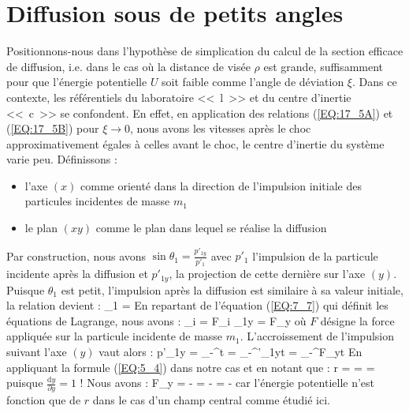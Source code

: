 \section{Diffusion sous de petits angles}

Positionnons-nous dans l'hypoth\`ese de simplication du calcul de la section efficace de diffusion, i.e. dans le cas o\`u la distance de vis\'ee $\rho$ est grande, suffisamment pour que l'\'energie potentielle $U$ soit faible comme l'angle de d\'eviation $\xi$. Dans ce contexte, les r\'ef\'erentiels du laboratoire <<~l~>> et du centre d'inertie <<~c~>> se confondent. En effet, en application des relations (\ref{EQ:17_5A}) et (\ref{EQ:17_5B}) pour $\xi \rightarrow 0$, nous avons les vitesses apr\`es le choc approximativement \'egales \`a celles avant le choc, le centre d'inertie du syst\`eme varie peu.
D\'efinissons :
\begin{itemize}
	\item l'axe $(x)$ comme orient\'e dans la direction de l'impulsion initiale des particules incidentes de masse $m_{1}$
	\item le plan $(xy)$ comme le plan dans lequel se r\'ealise la diffusion
\end{itemize}
Par construction, nous avons $\sin\theta_{1} = \frac{p'_{1y}}{p'_{1}}$ avec $p'_{1}$ l'impulsion de la particule incidente apr\`es la diffusion et $p'_{1y}$, la projection de cette derni\`ere sur l'axe $(y)$. Puisque $\theta_{1}$ est petit, l'impulsion apr\`es la diffusion est similaire \`a sa valeur initiale, la relation devient :
\be
	\theta_{1} =  \label{EQ:20_1}
\ee
En repartant de l'\'equation (\ref{EQ:7_7}) qui d\'efinit les \'equations de Lagrange, nous avons :
\be
	_{i} = F_{i} \Leftrightarrow {}_{1y} = F_{y}
\ee
o\`u $F$ d\'esigne la force appliqu\'ee sur la particule incidente de masse $m_{1}$. L'accroissement de l'impulsion suivant l'axe $(y)$ vaut alors :
\be
	p'_{1y} = \int_{-\infty}^{\infty}t = \int_{-\infty}^{\infty}'_{1y}t = \int_{-\infty}^{\infty}F_{y}t \label{EQ:20_2}
\ee
En appliquant la formule (\ref{EQ:5_4}) dans notre cas et en notant que :
\be
	r =  \Rightarrow {} =  = 
\ee
puisque $\frac{\mathrm{d}y}{\partial y} = 1$ ! Nous avons :
\be
	F_{y} = - = - = -
\ee
car l'\'energie potentielle n'est fonction que de $r$ dans le cas d'un champ central comme \'etudi\'e ici.

